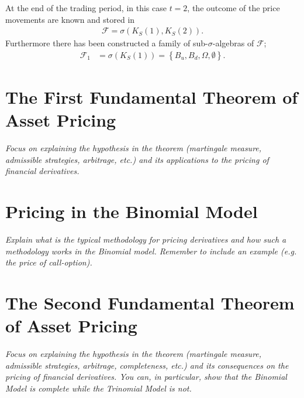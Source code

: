 \documentclass{article}
\theoremstyle{definition}
\numberwithin{equation}{section}
\begin{document}
At the end of the trading period, in this case $t = 2$, the outcome of the price movements are known and stored in
\begin{align}
    \mathscr{F} = \sigma\left(K_S(1), K_S(2)\right).
\end{align}
Furthermore there has been constructed a family of sub-$\sigma$-algebras of $\mathscr{F}$;
\begin{align}
    \mathscr{F}_1 &= \sigma(K_S(1)) = \left\{B_u, B_d, \Omega, \emptyset\right\}.
\end{align}
\newpage

\section{The First Fundamental Theorem of Asset Pricing}
\textit{Focus on explaining the hypothesis in the theorem (martingale measure, admissible strategies, arbitrage, etc.) and its applications to the pricing of financial derivatives.}

\newpage

\section{Pricing in the Binomial Model}
\textit{Explain what is the typical methodology for pricing derivatives and how such a methodology works in the Binomial model. Remember to include an example (e.g. the price of call-option).}

\newpage

\section{The Second Fundamental Theorem of Asset Pricing}
\textit{Focus on explaining the hypothesis in the theorem (martingale measure, admissible strategies, arbitrage, completeness, etc.) and its consequences on the pricing of financial derivatives. You can, in particular, show that the Binomial Model is complete while the Trinomial Model is not.}
\end{document}
